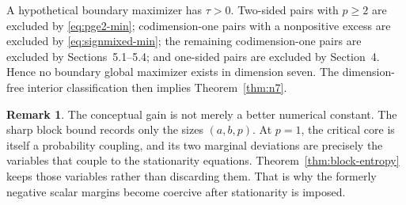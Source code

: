 \documentclass[11pt]{article}
\theoremstyle{definition}
\newtheorem{remark}[theorem]{Remark}
\begin{document}
A hypothetical boundary maximizer has $\tau>0$.  Two-sided pairs with $p\ge2$ are excluded by \eqref{eq:pge2-min}; codimension-one pairs with a nonpositive excess are excluded by \eqref{eq:signmixed-min}; the remaining codimension-one pairs are excluded by Sections~5.1--5.4; and one-sided pairs are excluded by Section~4.  Hence no boundary global maximizer exists in dimension seven.  The dimension-free interior classification then implies Theorem~\ref{thm:n7}.

\begin{remark}
The conceptual gain is not merely a better numerical constant.  The sharp block bound records only the sizes $(a,b,p)$.  At $p=1$, the critical core is itself a probability coupling, and its two marginal deviations are precisely the variables that couple to the stationarity equations.  Theorem~\ref{thm:block-entropy} keeps those variables rather than discarding them.  That is why the formerly negative scalar margins become coercive after stationarity is imposed.
\end{remark}
\end{document}
